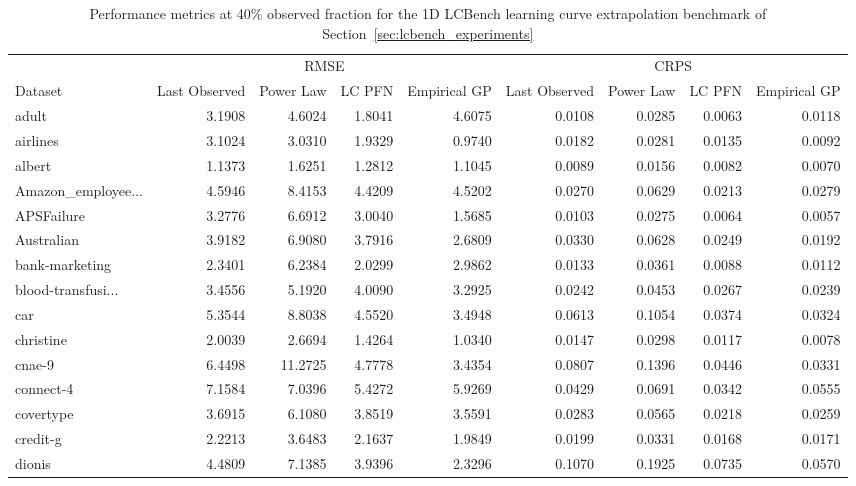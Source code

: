 \documentclass{article}
\begin{document}
\begin{table}[h]
\small
\centering
\setlength{\tabcolsep}{4pt}
\caption{Performance metrics at 40\% observed fraction for the 1D LCBench learning curve extrapolation benchmark of Section~\ref{sec:lcbench_experiments}}
\label{tab:results_perf_metrics_lc_extrapolation}
\begin{tabular}{l*{8}{r}}
\toprule
 & \multicolumn{4}{c}{RMSE} & \multicolumn{4}{c}{CRPS} \\
\cmidrule(lr){2-5} \cmidrule(lr){6-9}
Dataset & Last Observed & Power Law & LC PFN & Empirical GP & Last Observed & Power Law & LC PFN & Empirical GP \\
\midrule
adult & 3.1908 & 4.6024 & 1.8041 & 4.6075 & 0.0108 & 0.0285 & 0.0063 & 0.0118 \\
airlines & 3.1024 & 3.0310 & 1.9329 & 0.9740 & 0.0182 & 0.0281 & 0.0135 & 0.0092 \\
albert & 1.1373 & 1.6251 & 1.2812 & 1.1045 & 0.0089 & 0.0156 & 0.0082 & 0.0070 \\
Amazon\_employee... & 4.5946 & 8.4153 & 4.4209 & 4.5202 & 0.0270 & 0.0629 & 0.0213 & 0.0279 \\
APSFailure & 3.2776 & 6.6912 & 3.0040 & 1.5685 & 0.0103 & 0.0275 & 0.0064 & 0.0057 \\
Australian & 3.9182 & 6.9080 & 3.7916 & 2.6809 & 0.0330 & 0.0628 & 0.0249 & 0.0192 \\
bank-marketing & 2.3401 & 6.2384 & 2.0299 & 2.9862 & 0.0133 & 0.0361 & 0.0088 & 0.0112 \\
blood-transfusi... & 3.4556 & 5.1920 & 4.0090 & 3.2925 & 0.0242 & 0.0453 & 0.0267 & 0.0239 \\
car & 5.3544 & 8.8038 & 4.5520 & 3.4948 & 0.0613 & 0.1054 & 0.0374 & 0.0324 \\
christine & 2.0039 & 2.6694 & 1.4264 & 1.0340 & 0.0147 & 0.0298 & 0.0117 & 0.0078 \\
cnae-9 & 6.4498 & 11.2725 & 4.7778 & 3.4354 & 0.0807 & 0.1396 & 0.0446 & 0.0331 \\
connect-4 & 7.1584 & 7.0396 & 5.4272 & 5.9269 & 0.0429 & 0.0691 & 0.0342 & 0.0555 \\
covertype & 3.6915 & 6.1080 & 3.8519 & 3.5591 & 0.0283 & 0.0565 & 0.0218 & 0.0259 \\
credit-g & 2.2213 & 3.6483 & 2.1637 & 1.9849 & 0.0199 & 0.0331 & 0.0168 & 0.0171 \\
dionis & 4.4809 & 7.1385 & 3.9396 & 2.3296 & 0.1070 & 0.1925 & 0.0735 & 0.0570 \\

\end{tabular}
\end{table}
\end{document}
